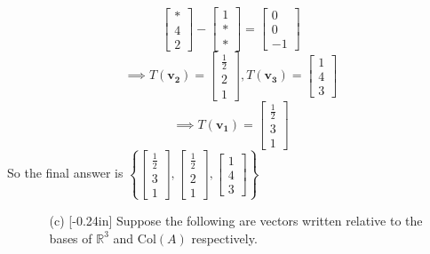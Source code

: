 \documentclass[letterpaper,12pt]{article}
\newcommand{\set}[1]{\left\{ #1 \right\}}
\theoremstyle{definition}
\begin{document}
\begin{enumerate}
\begin{mdframed}
$$\begin{bmatrix}
                * \\ 4 \\ 2
            \end{bmatrix} - \begin{bmatrix}
                1 \\ * \\ *
            \end{bmatrix} = \begin{bmatrix}
                0 \\ 0 \\ -1
            \end{bmatrix}$$
            $$\implies T(\mathbf{v_2}) = \begin{bmatrix}
                \frac{1}{2} \\ 2 \\ 1
            \end{bmatrix}, T(\mathbf{v_3}) = \begin{bmatrix}
                1 \\ 4 \\ 3
            \end{bmatrix}$$
            $$\implies T(\mathbf{v_1}) =\begin{bmatrix}
                \frac{1}{2} \\ 3 \\ 1
            \end{bmatrix} $$
            So the final answer is 
            $\set{\begin{bmatrix}
                \frac{1}{2} \\ 3 \\ 1
            \end{bmatrix},\begin{bmatrix}
                \frac{1}{2} \\ 2 \\ 1
            \end{bmatrix},\begin{bmatrix}
              1 \\ 4  \\ 3
            \end{bmatrix}}$
    \end{mdframed}
\end{enumerate}
\pagebreak
\begin{enumerate}
    \item[] \begin{enumerate}
        \item[(c)] \reversemarginpar{}[-0.24in]  Suppose the following are vectors written relative to the bases of $\mathbb{R}^3$ and $\mathrm{Col}(A)$ respectively.
    \end{enumerate}
\end{enumerate}
\end{document}
